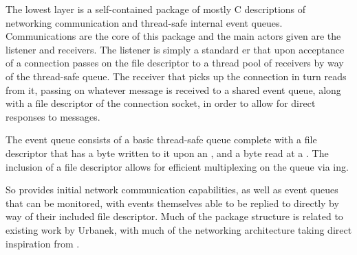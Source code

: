 The lowest layer is a self-contained package of mostly C descriptions of networking communication and thread-safe internal event queues.
Communications are the core of this package and the main actors given are the listener and receivers.
The listener is simply a standard er that upon acceptance of a connection passes on the file descriptor to a thread pool of receivers by way of the thread-safe queue.
The receiver that picks up the connection in turn reads from it, passing on whatever message is received to a shared event queue, along with a file descriptor of the connection socket, in order to allow for direct responses to messages.

The event queue consists of a basic thread-safe queue complete with a file descriptor that has a byte written to it upon an , and a byte read at a .
The inclusion of a file descriptor allows for efficient multiplexing on the queue via ing.

So \orcv provides initial network communication capabilities, as well as event queues that can be monitored, with events themselves able to be replied to directly by way of their included file descriptor.
Much of the package structure is related to existing work by Urbanek, with much of the networking architecture taking direct inspiration from \textcite{stevens1997network}.
